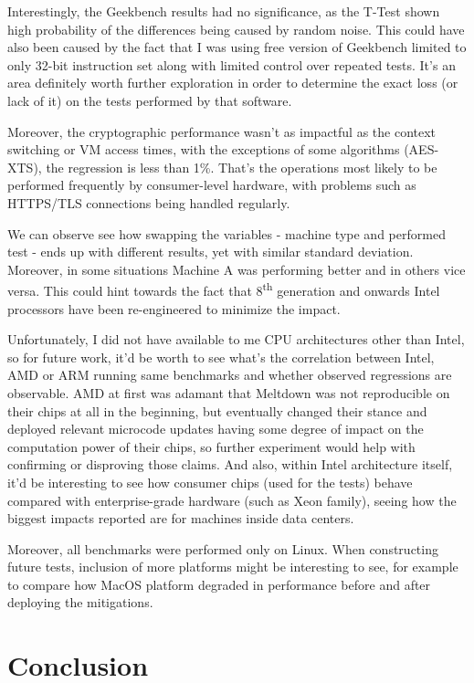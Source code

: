 \documentclass{csfourzero}
\begin{document}
Interestingly, the Geekbench results had no significance, as the T-Test shown high probability of the differences being caused by random noise. This could have also been caused by the fact that I was using free version of Geekbench limited to only 32-bit instruction set along with limited control over repeated tests. It's an area definitely worth further exploration in order to determine the exact loss (or lack of it) on the tests performed by that software.  

Moreover, the cryptographic performance wasn't as impactful as the context switching or VM access times, with the exceptions of some algorithms (AES-XTS), the regression is less than 1\%. That's the operations most likely to be performed frequently by consumer-level hardware, with problems such as HTTPS/TLS connections being handled regularly.

We can observe see how swapping the variables - machine type and performed test - ends up with different results, yet with similar standard deviation. Moreover, in some situations Machine A was performing better and in others vice versa. This could hint towards the fact that 8\textsuperscript{th} generation and onwards Intel processors have been re-engineered to minimize the impact.  

Unfortunately, I did not have available to me CPU architectures other than Intel, so for future work, it'd be worth to see what's the correlation between Intel, AMD or ARM running same benchmarks and whether observed regressions are observable. AMD at first was adamant that Meltdown was not reproducible on their chips at all in the beginning, but eventually changed their stance \cite{amdsec} and deployed relevant microcode updates having some degree of impact on the computation power of their chips, so further experiment would help with confirming or disproving those claims. And also, within Intel architecture itself, it'd be interesting to see how consumer chips (used for the tests) behave compared with enterprise-grade hardware (such as Xeon family), seeing how the biggest impacts reported are for machines inside data centers.

Moreover, all benchmarks were performed only on Linux. When constructing future tests, inclusion of more platforms might be interesting to see, for example to compare how MacOS platform degraded in performance before and after deploying the mitigations.

\section{Conclusion}
\label{sec:conc}
\end{document}
